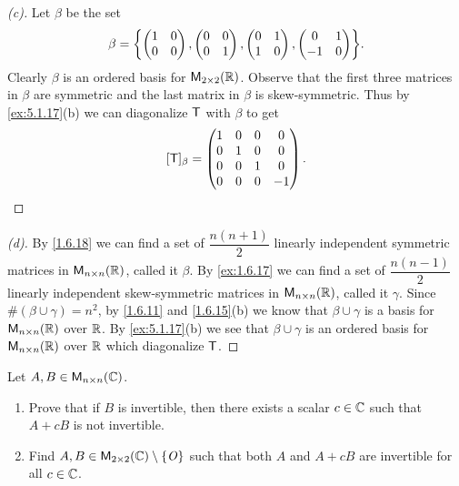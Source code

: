 \begin{proof}[(c)]
  Let \(\beta\) be the set
  \[
    \beta = \set{\begin{pmatrix}
        1 & 0 \\
        0 & 0
      \end{pmatrix}, \begin{pmatrix}
        0 & 0 \\
        0 & 1
      \end{pmatrix}, \begin{pmatrix}
        0 & 1 \\
        1 & 0
      \end{pmatrix}, \begin{pmatrix}
        0  & 1 \\
        -1 & 0
      \end{pmatrix}}.
  \]
  Clearly \(\beta\) is an ordered basis for \(\ms[2][2][\R]\).
  Observe that the first three matrices in \(\beta\) are symmetric and the last matrix in \(\beta\) is skew-symmetric.
  Thus by \cref{ex:5.1.17}(b) we can diagonalize \(\mathsf{T}\) with \(\beta\) to get
  \[
    [\mathsf{T}]_{\beta} = \begin{pmatrix}
      1 & 0 & 0 & 0  \\
      0 & 1 & 0 & 0  \\
      0 & 0 & 1 & 0  \\
      0 & 0 & 0 & -1
    \end{pmatrix}.
  \]
\end{proof}

\begin{proof}[(d)]
  By \cref{1.6.18} we can find a set of \(\dfrac{n(n + 1)}{2}\) linearly independent symmetric matrices in \(\ms[n][n][\R]\), called it \(\beta\).
  By \cref{ex:1.6.17} we can find a set of \(\dfrac{n(n - 1)}{2}\) linearly independent skew-symmetric matrices in \(\ms[n][n][\R]\), called it \(\gamma\).
  Since \(\#(\beta \cup \gamma) = n^2\), by \cref{1.6.11} and \cref{1.6.15}(b) we know that \(\beta \cup \gamma\) is a basis for \(\ms[n][n][\R]\) over \(\mathbb{R}\).
  By \cref{ex:5.1.17}(b) we see that \(\beta \cup \gamma\) is an ordered basis for \(\ms[n][n][\R]\) over \(\mathbb{R}\) which diagonalize \(\mathsf{T}\).
\end{proof}

\begin{ex}\label{ex:5.1.18}
  Let \(A, B \in \ms[n][n][\C]\).
  \begin{enumerate}
    \item Prove that if \(B\) is invertible, then there exists a scalar \(c \in \mathbb{C}\) such that \(A + cB\) is not invertible.
    \item Find \(A, B \in \ms[2][2][\C] \setminus \set{\zm}\) such that both \(A\) and \(A + cB\) are invertible for all \(c \in \mathbb{C}\).
  \end{enumerate}
\end{ex}


